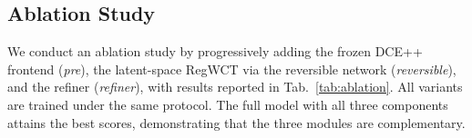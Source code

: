 \documentclass{article}
\begin{document}





\subsection{Ablation Study}

We conduct an ablation study by progressively adding the frozen DCE++ frontend (\textit{pre}), the latent-space RegWCT via the reversible network (\textit{reversible}), and the refiner (\textit{refiner}), with results reported in Tab.~\ref{tab:ablation}. All variants are trained under the same protocol. The full model with all three components attains the best scores, demonstrating that the three modules are complementary.
\end{document}
